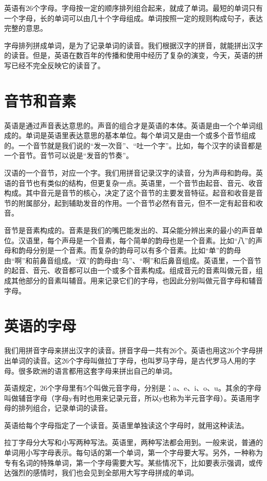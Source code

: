 \documentclass[10.5pt, a4paper]{ctexbook} %
\begin{document}
英语有26个字母。字母按一定的顺序排列组合起来，就成了单词。最短的单词只有一个字母，长的单词可以由几十个字母组成。单词按照一定的规则构成句子，表达完整的意思。

字母排列拼成单词，是为了记录单词的读音。我们根据汉字的拼音，就能拼出汉字的读音。但是，英语在数百年的传播和使用中经历了复杂的演变，今天，英语的拼写已经不完全反映它的读音了。

\section{音节和音素}

英语是通过声音表达意思的。声音的组合才是英语的本体。英语是由一个个单词组成的。单词是英语里表达意思的基本单位。每个单词又是由一个或多个音节组成的。一个音节就是我们说的“发一次音”、“吐一个字”。比如，每个汉字的读音都是一个音节。音节可以说是“发音的节奏”。

汉语的一个音节，对应一个字。我们用拼音记录汉字的读音，分为声母和韵母。英语的音节也有类似的结构，但更复杂一点。英语里，一个音节由起音、音元、收音构成。其中音元是音节的核心，决定了这个音节的主要发音特征。起音和收音是音节的附属部分，起到辅助发音的作用。一个音节必然有音元，但不一定有起音和收音。

音节是音素构成的。音素是我们的嘴巴能发出的、耳朵能分辨出来的最小的声音单位。汉语里，每个声母是一个音素，每个简单的韵母也是一个音素。比如“八”的声母和韵母分别是一个音素。而复杂的韵母可以有多个音素。比如“单”的韵母由“啊”和前鼻音组成。“双”的韵母由“乌”、“啊”和后鼻音组成。英语里，一个音节的起音、音元、收音都可以由一个或多个音素构成。组成音元的音素叫做元音，组成其他部分的音素叫辅音。用来记录它们的字母，也因此分别叫做元音字母和辅音字母。

\section{英语的字母}

我们用拼音字母来拼出汉字的读音。拼音字母一共有26个。英语也用这26个字母拼出单词的读音。这26个字母叫做拉丁字母，也叫罗马字母，是古代罗马人用的字母。很多欧洲的语言都用这套字母来拼出自己的单词。

英语规定，26个字母里有5个叫做元音字母，分别是：a、e、i、o、u。其余的字母叫做辅音字母（字母y有时也用来记录元音，所以y也称为半元音字母）。英语用字母的排列组合，记录单词的读音。

英语给每个字母指定了一个读音。英语里单独读这个字母时，就用这种读法。

拉丁字母分大写和小写两种写法。英语里，两种写法都会用到。一般来说，普通的单词用小写字母表示。每句话的第一个单词，第一个字母要大写。另外，一种称为专有名词的特殊单词，第一个字母需要大写。某些情况下，比如要表示强调，或传达强烈的感情时，我们也会见到全部用大写字母拼成的单词。
\end{document}
